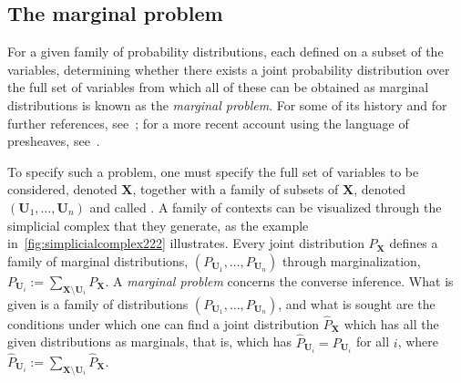 \subsection{The marginal problem}\label{step:marginalsproblem}

For a given family of probability distributions, each defined on a subset of the variables, determining whether there exists a joint probability distribution over the full set of variables from which all of these can be obtained as marginal distributions is known as the {\em marginal problem}.
For some of its history and for further references, see~\cite{fritz2013marginal}; for a more recent account using the language of presheaves, see~\cite{abramsky_contextuality_2011}.

To specify such a problem, one must specify the full set of variables to be considered, denoted $\bm{X}$, together with a family of subsets of $\bm{X}$, denoted $(\bm{U}_1,\ldots,\bm{U}_n)$ and called .
A family of contexts can be visualized through 
the simplicial complex that they generate, as the example in~\cref{fig:simplicialcomplex222} illustrates. Every joint distribution $P_{\bm{X}}$ %
defines a family of marginal distributions, $(P_{\bm{U}_1},\ldots,P_{\bm{U}_n})$ through marginalization,  $P_{\bm{U}_i} := \sum_{\bm{X} \setminus \bm{U}_i} P_{\bm{X}}$. A \emph{marginal problem} concerns the converse inference.  What is given is a family of distributions $(P_{\bm{U}_1},\ldots,P_{\bm{U}_n})$, and what is sought are the conditions under which one can find a joint distribution $\hat{P}_{\bm{X}}$ which has all the given distributions as marginals, that is, which has $\hat{P}_{\bm{U}_i} = P_{\bm{U}_i}$ for all $i$, where $\hat{P}_{\bm{U}_i} := \sum_{\bm{X} \setminus \bm{U}_i} \hat{P}_{\bm{X}}$.

